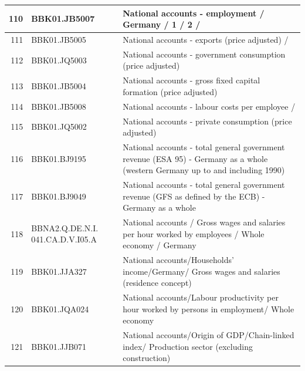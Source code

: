 \documentclass[12pt]{article}
\begin{document}
\begin{table}
\begin{tabular}{rp{5cm}p{11cm}}
  \hline  110 & BBK01.JB5007 & National accounts - employment / Germany / 1 / 2 / \\ 
  \hline
  111 & BBK01.JB5005 & National accounts - exports (price adjusted) / \\ 
  \hline
  112 & BBK01.JQ5003 & National accounts - government consumption (price adjusted) \\ 
  \hline
  113 & BBK01.JB5004 & National accounts - gross fixed capital formation (price adjusted) \\ 
  \hline
  114 & BBK01.JB5008 & National accounts - labour costs per employee / \\ 
  \hline
  115 & BBK01.JQ5002 & National accounts - private consumption (price adjusted) \\ 
  \hline
  116 & BBK01.BJ9195 & National accounts - total general government revenue (ESA 95) - Germany as a whole (western Germany up to and including 1990) \\ 
  \hline
  117 & BBK01.BJ9049 & National accounts - total general government revenue (GFS as defined by the ECB) - Germany as a whole \\ 
  \hline
  118 & BBNA2.Q.DE.N.I. 041.CA.D.V.I05.A & National accounts / Gross wages and salaries per hour worked by employees /  Whole economy / Germany \\ 
  \hline
  119 & BBK01.JJA327 & National accounts/Households' income/Germany/ Gross wages and salaries (residence concept) \\ 
  \hline
  120 & BBK01.JQA024 & National accounts/Labour productivity per hour worked by persons in employment/ Whole economy \\ 
  \hline
  121 & BBK01.JJB071 & National accounts/Origin of GDP/Chain-linked index/ Production sector (excluding construction) \\ 
\end{tabular}
\end{table}
\end{document}

